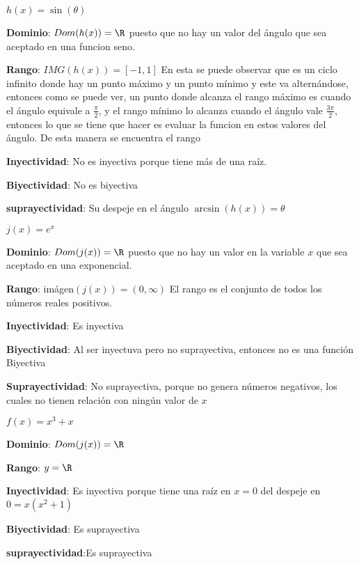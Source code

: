 \begin{example}

	$h(x)= \sin(\theta)$

	\textbf{Dominio}: $Dom(h(x))=\R$ puesto que no hay un valor del ángulo que sea aceptado en una funcion seno.

	\textbf{Rango}: $IMG(h(x))= [-1,1]$ En esta se puede observar que es un ciclo infinito donde hay un punto máximo y un punto mínimo y este va alternándose, entonces como se puede ver, un punto donde alcanza el rango máximo es cuando el ángulo equivale a $\frac{\pi}{2}$, y el rango mínimo lo alcanza cuando el ángulo vale $\frac{3\pi}{2}$, entonces lo que se tiene que hacer es evaluar la funcion en estos valores del ángulo. De esta manera se encuentra el rango

	\textbf{Inyectividad}: No es inyectiva porque tiene más de una raíz.

	\textbf{Biyectividad}: No es biyectiva

	\textbf{suprayectividad}: Su despeje en el ángulo $\arcsin(h(x))= \theta$

\end{example}

\begin{example}

	$j(x)=e^{x}$

	\textbf{Dominio}: $Dom(j(x))=\R$ puesto que no hay un valor en la variable $x$ que sea aceptado en una exponencial.

	\textbf{Rango}: imágen$(j(x))= \left(0, \infty \right)$ El rango es el conjunto de todos los números reales positivos.

	\textbf{Inyectividad}: Es inyectiva

	\textbf{Biyectividad}: Al ser inyectuva pero no suprayectiva, entonces no es una función Biyectiva

	\textbf{Suprayectividad}: No suprayectiva, porque no genera números negativos, los cuales no tienen relación con ningún valor de $x$

\end{example}

\begin{example}

	$f(x)=x^3+x$

	\textbf{Dominio}: $Dom(j(x))=\R$

	\textbf{Rango}: $y=\R$

	\textbf{Inyectividad}: Es inyectiva porque tiene una raíz en $x=0$ del despeje en $0=x\left(x^2 +1\right)$

	\textbf{Biyectividad}: Es suprayectiva

	\textbf{suprayectividad}:Es suprayectiva

\end{example}

